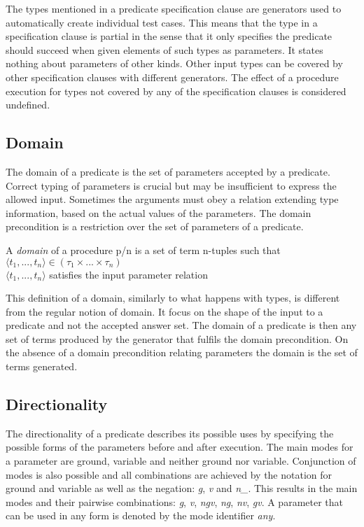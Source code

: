 The types mentioned in a predicate specification clause are \plqc{}
generators used to automatically create individual test cases.
%
This means that the type in a specification clause is partial in the
sense that it only specifies the predicate should succeed when given
elements of such types as parameters.
%
It states nothing about parameters of other kinds.
%
Other input types can be covered by other specification clauses with
different generators.
%
The effect of a procedure execution for types not covered by any of the
specification clauses is considered undefined.


\subsection{Domain}

The domain of a predicate is the set of parameters accepted by a
predicate.
%
Correct typing of parameters is crucial but may be insufficient to
express the allowed input.
%
Sometimes the arguments must obey a relation extending type information,
based on the actual values of the parameters.
%
The domain precondition is a restriction over the set of parameters of a
predicate.


\begin{definition}
\label{def:domain}
A {\em domain} of a procedure p/n is a set of term
n-tuples such that\\
\qquad $\langle t_1,...,t_n \rangle \in (\tau_1 \times ... \times
\tau_n)$\\
\qquad $\langle t_1,...,t_n \rangle$ satisfies the input parameter relation
\end{definition}


This definition of a domain, similarly to what happens with types, is
different from the regular notion of domain.
%
It focus on the shape of the input to a predicate and not the accepted
answer set.
%
The \plqc{} domain of a predicate is then any set of terms produced by
the generator that fulfils the domain precondition.
%
On the absence of a domain precondition relating parameters the domain
is the set of terms generated.


\subsection{Directionality}
The directionality of a predicate describes its possible uses by
specifying the possible forms of the parameters before and after
execution.
%
The main modes for a parameter are ground, variable and neither ground
nor variable.
%
Conjunction of modes is also possible and all combinations are achieved
by the notation for ground and variable as well as the negation:
\emph{g}, \emph{v} and \emph{n\_}.
%
This results in the main modes and their pairwise combinations: \emph{g},
\emph{v}, \emph{ngv},  \emph{ng}, \emph{nv}, \emph{gv}.
%
A parameter that can be used in any form is denoted by the mode
identifier \emph{any}.


